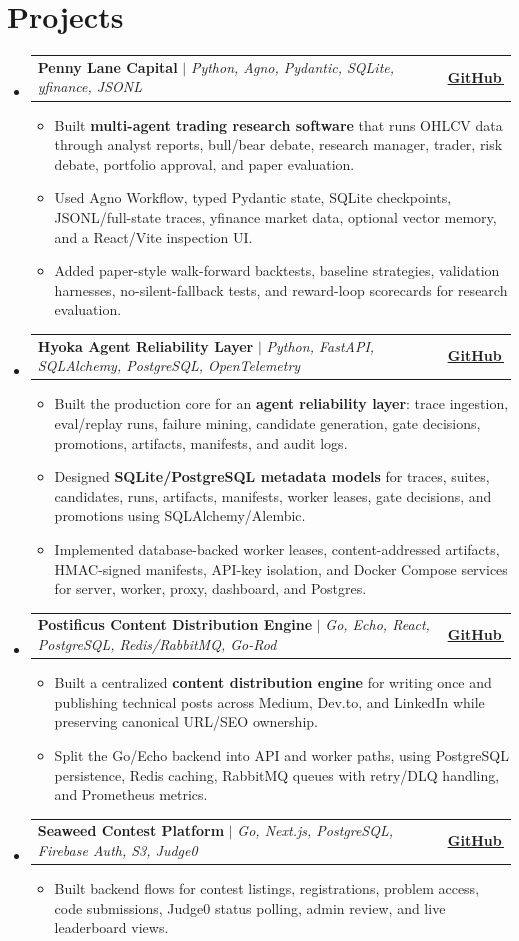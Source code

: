 \documentclass[letterpaper,11pt]{article}
\makeatletter
\newcommand{\bodyhref}[2]{\href{#1}{\underline{#2}\,\faExternalLink*}}
\newcommand{\resumeItem}[1]{\item{\fontsize{8.82pt}{9.28pt}\selectfont #1\vspace{-0.7pt}}}
\newcommand{\resumeProjectHeading}[2]{
    \item
    \begin{tabular*}{1.0\textwidth}{l@{\extracolsep{\fill}}r}
      \small#1 & \textbf{\small #2}\\
    \end{tabular*}\vspace{-4pt}
}
\newcommand{\resumeSubHeadingListStart}{\begin{itemize}[leftmargin=0.0in, label={}, itemsep=0.6pt, topsep=0pt, parsep=0pt, partopsep=0pt]}
\newcommand{\resumeSubHeadingListEnd}{\end{itemize}}
\newcommand{\resumeItemListStart}{\begin{itemize}[leftmargin=0.16in,itemsep=0.3pt,topsep=0.9pt,parsep=0pt,partopsep=0pt]}
\newcommand{\resumeItemListEnd}{\end{itemize}\vspace{-3pt}}
\makeatother
\begin{document}
\section{Projects}
\resumeSubHeadingListStart
\resumeProjectHeading
{\textbf{Penny Lane Capital} $|$ \emph{Python, Agno, Pydantic, SQLite, yfinance, JSONL}}{\bodyhref{https://github.com/unichronic/pennylane}{GitHub}}
\resumeItemListStart
\resumeItem{Built \textbf{multi-agent trading research software} that runs OHLCV data through analyst reports, bull/bear debate, research manager, trader, risk debate, portfolio approval, and paper evaluation.}
\resumeItem{Used Agno Workflow, typed Pydantic state, SQLite checkpoints, JSONL/full-state traces, yfinance market data, optional vector memory, and a React/Vite inspection UI.}
\resumeItem{Added paper-style walk-forward backtests, baseline strategies, validation harnesses, no-silent-fallback tests, and reward-loop scorecards for research evaluation.}
\resumeItemListEnd
\resumeProjectHeading
{\textbf{Hyoka Agent Reliability Layer} $|$ \emph{Python, FastAPI, SQLAlchemy, PostgreSQL, OpenTelemetry}}{\bodyhref{https://github.com/unichronic/hyoka}{GitHub}}
\resumeItemListStart
\resumeItem{Built the production core for an \textbf{agent reliability layer}: trace ingestion, eval/replay runs, failure mining, candidate generation, gate decisions, promotions, artifacts, manifests, and audit logs.}
\resumeItem{Designed \textbf{SQLite/PostgreSQL metadata models} for traces, suites, candidates, runs, artifacts, manifests, worker leases, gate decisions, and promotions using SQLAlchemy/Alembic.}
\resumeItem{Implemented database-backed worker leases, content-addressed artifacts, HMAC-signed manifests, API-key isolation, and Docker Compose services for server, worker, proxy, dashboard, and Postgres.}
\resumeItemListEnd
\resumeProjectHeading
{\textbf{Postificus Content Distribution Engine} $|$ \emph{Go, Echo, React, PostgreSQL, Redis/RabbitMQ, Go-Rod}}{\bodyhref{https://github.com/unichronic/postificus}{GitHub}}
\resumeItemListStart
\resumeItem{Built a centralized \textbf{content distribution engine} for writing once and publishing technical posts across Medium, Dev.to, and LinkedIn while preserving canonical URL/SEO ownership.}
\resumeItem{Split the Go/Echo backend into API and worker paths, using PostgreSQL persistence, Redis caching, RabbitMQ queues with retry/DLQ handling, and Prometheus metrics.}
\resumeItemListEnd
\resumeProjectHeading
{\textbf{Seaweed Contest Platform} $|$ \emph{Go, Next.js, PostgreSQL, Firebase Auth, S3, Judge0}}{\bodyhref{https://github.com/unichronic/seaweed-fe}{GitHub}}
\resumeItemListStart
\resumeItem{Built backend flows for contest listings, registrations, problem access, code submissions, Judge0 status polling, admin review, and live leaderboard views.}
\resumeItemListEnd
\resumeSubHeadingListEnd
\end{document}
